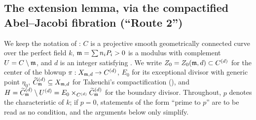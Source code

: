 %
%
%

\subsection*{The extension lemma, via the compactified Abel--Jacobi fibration (``Route 2'')}

We keep the notation of :
$C$ is a projective smooth geometrically connected curve over the perfect field $k$,
$\mathfrak{m} = \sum n_i P_i > 0$ is a modulus with complement $U = C \setminus \mathfrak{m}$,
and $d$ is an integer satisfying .
We write $Z_0 = Z_0(\mathfrak{m}, d) \subset C^{(d)}$ for the center of the blowup
$\pi : X_{\mathfrak{m}, d} \to C^{(d)}$, $E_0$ for its exceptional divisor with generic point $\eta_0$,
$\widetilde{C}_{\mathfrak{m}}^{(d)} \subseteq X_{\mathfrak{m},d}$ for Takeuchi's compactification
(), and
$H = \widetilde{C}_{\mathfrak{m}}^{(d)} \setminus U^{(d)} = E_0 \times_{C^{(d)}} \widetilde{C}_{\mathfrak{m}}^{(d)}$ for the boundary divisor.
Throughout, $p$ denotes the characteristic of $k$; if $p = 0$, statements of the form
``prime to $p$'' are to be read as no condition, and the arguments below only simplify.

